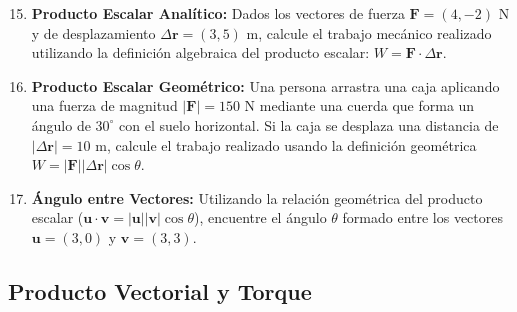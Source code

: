 \documentclass[11pt,a4paper]{book}
\begin{document}
\begin{enumerate}
    \setcounter{enumi}{14}
    \item \textbf{Producto Escalar Analítico:} Dados los vectores de fuerza $\boldsymbol{F} = (4, -2) \text{ N}$ y de desplazamiento $\Delta\boldsymbol{r} = (3, 5) \text{ m}$, calcule el trabajo mecánico realizado utilizando la definición algebraica del producto escalar: $W = \boldsymbol{F} \cdot \Delta\boldsymbol{r}$.
    
    \item \textbf{Producto Escalar Geométrico:} Una persona arrastra una caja aplicando una fuerza de magnitud $|\boldsymbol{F}| = 150 \text{ N}$ mediante una cuerda que forma un ángulo de $30^\circ$ con el suelo horizontal. Si la caja se desplaza una distancia de $|\Delta\boldsymbol{r}| = 10 \text{ m}$, calcule el trabajo realizado usando la definición geométrica $W = |\boldsymbol{F}| |\Delta\boldsymbol{r}| \cos\theta$.
    
    \item \textbf{Ángulo entre Vectores:} Utilizando la relación geométrica del producto escalar ($\boldsymbol{u} \cdot \boldsymbol{v} = |\boldsymbol{u}| |\boldsymbol{v}| \cos\theta$), encuentre el ángulo $\theta$ formado entre los vectores $\boldsymbol{u} = (3, 0)$ y $\boldsymbol{v} = (3, 3)$.
\end{enumerate}

\subsection*{Producto Vectorial y Torque}
\end{document}
